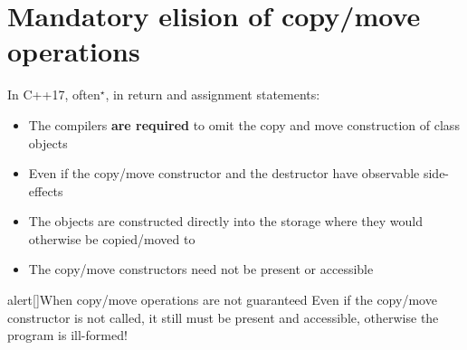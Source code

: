 \section{Mandatory elision of copy/move operations}
\begin{frame}{\insertsectionhead}
    In C++17, often$^{\star}$, in return and assignment statements:\hfill {\footnotesize{}}
    \begin{itemize}
        \item The compilers \alert{\textbf{are required}} to omit the copy and move construction of class objects
        \item Even if the copy/move constructor and the destructor have observable side-effects
        \item The objects are constructed directly into the storage where they would otherwise be copied/moved to \item The copy/move constructors need not be present or accessible
    \end{itemize}
    \begin{varblock}{alert}[\textwidth]{When copy/move operations are not guaranteed}
        Even if the copy/move constructor is not called, it still must be present and accessible, otherwise the program is ill-formed!
    \end{varblock}
    \PrepareURLsymbol[PB]
\end{frame}
